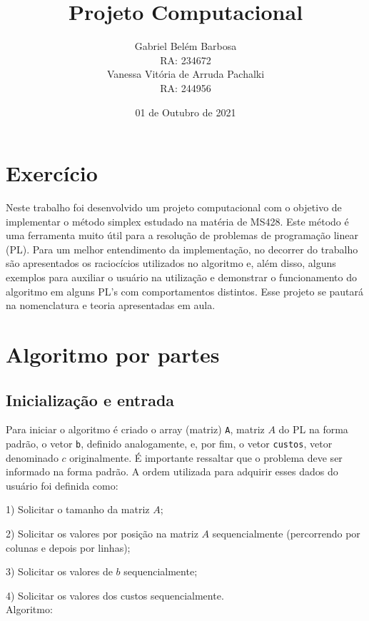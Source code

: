 \documentclass[]{article}
\begin{document}
\title{\Large{\textbf{Projeto Computacional}}}
\author{
        Gabriel Belém Barbosa \\RA: 234672 \\
        Vanessa Vitória de Arruda Pachalki \\RA: 244956
}
\date{01 de Outubro de 2021}

\maketitle
\let\cleardoublepage\clearpage
\newpage
\setcounter{page}{2}
\tableofcontents
\newpage
\section{Exercício}
Neste trabalho foi desenvolvido um projeto computacional com o objetivo de implementar o método simplex estudado na matéria de MS428. Este método é uma ferramenta muito útil para a resolução de problemas de programação linear (PL). Para um melhor entendimento da implementação, no decorrer do trabalho são apresentados os raciocícios utilizados no algoritmo e, além disso, alguns exemplos para auxiliar o usuário na utilização e demonstrar o funcionamento do algoritmo em alguns PL's com comportamentos distintos. Esse projeto se pautará na nomenclatura e teoria apresentadas em aula.

\section{Algoritmo por partes}
\subsection{Inicialização e entrada}
Para iniciar o algoritmo é criado o array (matriz) \verb+A+, matriz $A$ do PL na forma padrão, o vetor \verb+b+, definido analogamente, e, por fim, o vetor \verb+custos+, vetor denominado $c$ originalmente. É importante ressaltar que o problema deve ser informado na forma padrão. A ordem utilizada para adquirir esses dados do usuário foi definida como:

1) Solicitar o tamanho da matriz $A$;

2) Solicitar os valores por posição na matriz $A$ sequencialmente (percorrendo por colunas e depois por linhas);

3) Solicitar os valores de $b$ sequencialmente;

4) Solicitar os valores dos custos sequencialmente.
\\Algoritmo:
\end{document}
